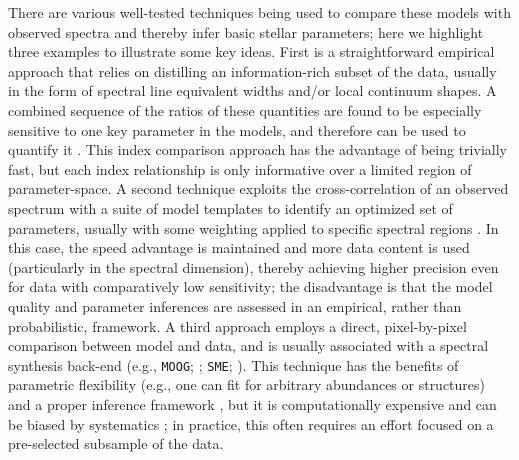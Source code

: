 \documentclass[iop,floatfix]{emulateapj}
\begin{document}
There are various well-tested techniques being used to compare these models with observed spectra 
and thereby infer basic stellar parameters; here we highlight three examples to illustrate some key 
ideas.  First is a straightforward empirical approach that relies on distilling an information-rich 
subset of the data, usually in the form of spectral line equivalent widths and/or local continuum 
shapes.  A combined sequence of the ratios of these quantities are found to be especially sensitive 
to one key parameter in the models, and therefore can be used to quantify it 
\citep[e.g.,][]{gray94,reid95,rojas-ayala10,rojas-ayala12}.  This index comparison approach has 
the advantage of being trivially fast, but each index relationship is only informative over a 
limited region of parameter-space.  A second technique exploits the cross-correlation of an 
observed spectrum with a suite of model templates to identify an optimized set of parameters, 
usually with some weighting applied to specific spectral regions \citep[e.g., {\tt 
SPC};][]{buchhave12}.  In this case, the speed advantage is maintained and more data content is 
used (particularly in the spectral dimension), thereby achieving higher precision even for data 
with comparatively low sensitivity; the disadvantage is that the model quality and parameter 
inferences are assessed in an empirical, rather than probabilistic, framework.  A third approach 
employs a direct, pixel-by-pixel comparison between model and data, and is usually associated with 
a spectral synthesis back-end (e.g., {\tt MOOG}; \citealt{sneden73}; {\tt SME}; 
\citealt{valenti96}).  This technique has the benefits of parametric flexibility (e.g., one can fit 
for arbitrary abundances or structures) and a proper inference framework \citep[usually a 
least-squares approach, although increasingly in a Bayesian format;][]{shkedy07,schoenrich13}, but 
it is computationally expensive and can be biased by systematics \citep[e.g.,][]{mann13}; in 
practice, this often requires an effort focused on a pre-selected subsample of the data. 
\end{document}
